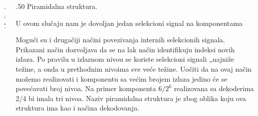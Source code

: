 \begin{frame}[t,label=03-s009]
\gusttekst
\begin{columns}[c,onlytextwidth]
\begin{column}{.47\textwidth}\centering

\end{column}
\begin{column}{.50\textwidth}
Piramidalna struktura.

U ovom slučaju nam je dovoljan jedan selekcioni signal na komponentama

Mogući su i drugačiji načini povezivanja internih selekcionih signala. Prikazani način dozvoljava da se na lak način identifikuju indeksi novih izlaza. Po pravilu u izlaznom nivou se koriste selekcioni signali „najniže težine, a onda u prethodnim nivoima sve veće težine. Uočiti da na ovaj način možemo realizovati i komponentu sa većim brojem izlaza jedino će se povećavati broj nivoa. Na primer komponenta \(6/2^6\) realizovana sa dekoderima 2/4 bi imala tri nivoa. Naziv piramidalna struktura je zbog oblika koju ova struktura ima kao i načina dekodovanja.
\end{column}
\end{columns}
\end{frame}
